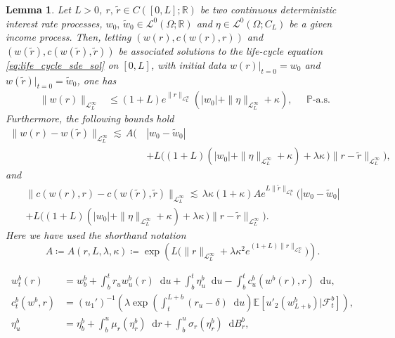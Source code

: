 \documentclass[10pt,a4paper]{amsart}
\theoremstyle{plain}
\newtheorem{lem}{Lemma}
\theoremstyle{plain}
\theoremstyle{definition}
\theoremstyle{remark}
\newcommand{\EE}{\mathbb{E}}
\newcommand{\cF}{\mathcal{F}}
\newcommand{\dd}{\mathop{}\!\mathrm{d}}
\newcommand{\mbP}{\mathbb{P}}
\newcommand{\mbR}{\mathbb{R}}
\newcommand{\msL}{\mathscr{L}}
\newcommand{\tzero}{|_{t=0}}
\begin{document}
\begin{lem}\label{lem:LC_rate_stable} Let $L>0$, $r,\,\tilde{r} \in C([0,L];\mbR)$ be two continuous deterministic interest rate processes, $w_0,\,\tilde{w}_0 \in \msL^0(\Omega;\mbR)$ and $\eta \in \msL^0(\Omega;C_L)$ be a given income process. Then, letting $(w(r),c(w(r),r))$ and $(w(\tilde{r}),c(w(\tilde{r}),\tilde{r}))$ be associated solutions to the life-cycle equation \eqref{eq:life_cycle_sde_sol} on $[0,L]$, with initial data $w(r)\tzero=w_0$ and $w(\tilde{r})\tzero =\tilde{w}_0$, one has
%
%
\begin{equation}\label{eq:wealth_apriori_bound}
\begin{aligned}
     \|w(r)\|_{\msL^\infty_L}  &\leq  (1+L)e^{\|r\|_{\msL^\infty_L}} \left(|w_0| +  \|\eta\|_{\msL^\infty_L}+ \kappa \right),
\end{aligned}
     \quad \mbP\text{-a.s.}
    \end{equation}
%
%
Furthermore, the following bounds hold
%
\begin{equation}\label{eq:wealth_rate_stability}
\begin{aligned}
    \|w(r)-w(\tilde{r})\|_{\msL^\infty_L} \lesssim \,A \bigg( \, &|w_0-\tilde{w}_0|\\
    &+ L\bigg( (1+L)\left(|w_0| +  \|\eta\|_{\msL^\infty_L}+ \kappa \right)  +  \lambda  \kappa \, \bigg)\|r-\tilde{r}\|_{\msL^\infty_L}\bigg),
    \end{aligned}
\end{equation}
%
and
%
\begin{multline}\label{eq:consump_rate_stability}
     \|c(w(r),r)-c(w(\tilde{r}),\tilde{r})\|_{\msL^\infty_L} \lesssim \, \lambda \kappa (1+\kappa) Ae^{L\|\tilde{r}\|_{\msL^\infty_L}}   \bigg( |w_0-\tilde{w}_0|\\
     	+ L\bigg( (1+L)\left(|w_0| +  \|\eta\|_{\msL^\infty_L} + \kappa \right)  +  \lambda  \kappa \, \bigg)\|r-\tilde{r}\|_{\msL^\infty_L} \bigg).
\end{multline}
Here we have used the shorthand notation
%
\begin{equation*}
    A\coloneqq A(r,L,\lambda,\kappa) \coloneqq \exp\left(L\Big(\|r\|_{\msL^\infty_L} + \lambda \kappa^2 e^{(1+L)\|r\|_{\msL^\infty_L}  }\Big) \right).
\end{equation*}



   \end{lem}

\begin{align}
%
        w^b_t(r) &= w^b_b + \int_b^t r_u w^{b}_u(r) \dd u + \int_b^t \eta^b_u  \dd u - \int_b^t c_u^b(w^b(r),r) \dd u, \label{eq:olg_wealth}
        \\
          c_t^{b}(w^b,r) &= (u_1')^{-1}\left(\lambda \exp\left(\int_t^{L+b} (r_u-\delta)\dd u\right)\EE\left[ u'_2\left(w_{L+b}^{b}\right)|\cF_t^b \right]\right),  \label{eq:olg_consumption}\\
\eta^b_u &= \eta^b_b +\int_{b}^u \mu_r(\eta^b_r) \dd r + \int_{b}^u \sigma_r(\eta^b_r) \dd B^b_r, \label{eq:olg_income}
%
%
\end{align}
\end{document}
